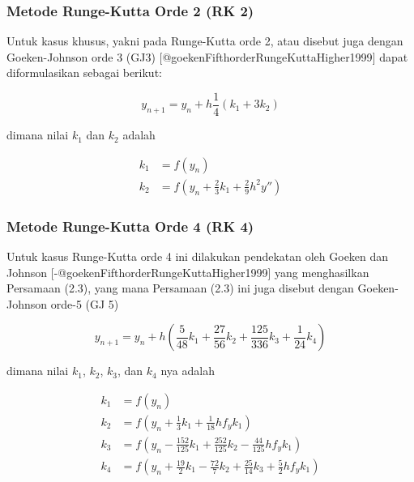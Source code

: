 \hypertarget{metode-runge-kutta-orde-2-rk-2}{%
	\subsubsection{Metode Runge-Kutta Orde 2 (RK
		2)}\label{metode-runge-kutta-orde-2-rk-2}}

Untuk kasus khusus, yakni pada Runge-Kutta orde 2, atau disebut juga
dengan Goeken-Johnson orde 3 (GJ3)
{[}@goekenFifthorderRungeKuttaHigher1999{]} dapat diformulasikan sebagai
berikut:

\[
	\tag{2.2}
	y_{n+1} = y_n + h \frac{1}{4} (k_1 + 3k_2)
\]

dimana nilai \(k_1\) dan \(k_2\) adalah

\[
	\begin{aligned}
		k_1 & = f(y_n)                                                     \\
		k_2 & = f \left (y_n + \frac{2}{3}k_1 + \frac{2}{9}h^2 y''\right )
	\end{aligned}
\]

\hypertarget{metode-runge-kutta-orde-4-rk-4}{%
	\subsubsection{Metode Runge-Kutta Orde 4 (RK
		4)}\label{metode-runge-kutta-orde-4-rk-4}}

Untuk kasus Runge-Kutta orde 4 ini dilakukan pendekatan oleh Goeken
dan Johnson {[}-@goekenFifthorderRungeKuttaHigher1999{]} yang
menghasilkan Persamaan (2.3), yang mana Persamaan (2.3) ini juga disebut
dengan Goeken-Johnson orde-5 (GJ 5)

\[
	\tag{2.3}
	y_{n+1} = y_n + h \left ( \frac{5}{48} k_1 + \frac{27}{56} k_2 + \frac{125}{336}k_3 + \frac{1}{24}k_4 \right )
\]

dimana nilai \(k_1\), \(k_2\), \(k_3\), dan \(k_4\) nya adalah

\[
	\begin{aligned}
		k_1 & = f(y_n)                                                                                                \\
		k_2 & = f \left ( y_n + \frac{1}{3}k_1 + \frac{1}{18}h f_y k_1 \right )                                       \\
		k_3 & = f \left ( y_n - \frac{152}{125}k_1 + \frac{252}{125}k_2 - \frac{44}{125}h f_y k_1 \right )            \\
		k_4 & = f \left ( y_n + \frac{19}{2}k_1 - \frac{72}{7}k_2 + \frac{25}{14}k_3 + \frac{5}{2} h f_y k_1 \right )
	\end{aligned}
\]

